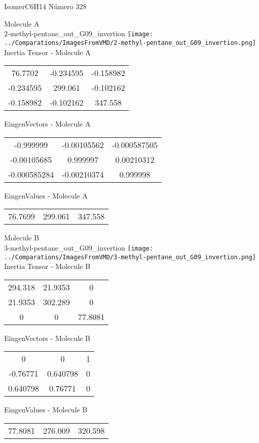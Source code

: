 \vtab[-2cm]
\begin{center}
{\large IsomerC6H14 \tab Número 328}
\end{center}
\begin{multicols}{2}
\begin{center}

Molecule A \\ 
2-methyl-pentane\_out\_G09\_invertion
\texttt{[image: ../Comparations/ImagesFromVMD/2-methyl-pentane\_out\_G09\_invertion.png]}
\\
Inertia Tensor - Molecule A \\
\vtab

\begin{tabular}{|c c c|}
76.7702	 & 	-0.234595	 & 	-0.158982	 \\
-0.234595	 & 	299.061	 & 	-0.102162	 \\
-0.158982	 & 	-0.102162	 & 	347.558
\end{tabular}

\vtab
 EingenVectors - Molecule A     \\
\vtab
\begin{tabular}{|c c c|}
-0.999999	 & 	-0.00105562	 & 	-0.000587505	 \\
-0.00105685	 & 	0.999997	 & 	0.00210312	 \\
-0.000585284	 & 	-0.00210374	 & 	0.999998
\end{tabular}

\vtab
 EingenValues - Molecule A     \\
\vtab
\begin{tabular}{|c c c|}
76.7699	 & 	299.061	 & 	347.558	 \\
\end{tabular}
\columnbreak

Molecule B \\ 
3-methyl-pentane\_out\_G09\_invertion
\texttt{[image: ../Comparations/ImagesFromVMD/3-methyl-pentane\_out\_G09\_invertion.png]}
\\
Inertia Tensor - Molecule B \\
\vtab

\begin{tabular}{|c c c|}
294.318	 & 	21.9353	 & 	0	 \\
21.9353	 & 	302.289	 & 	0	 \\
0	 & 	0	 & 	77.8081
\end{tabular}

\vtab
 EingenVectors - Molecule B     \\
\vtab
\begin{tabular}{|c c c|}
0	 & 	0	 & 	1	 \\
-0.76771	 & 	0.640798	 & 	0	 \\
0.640798	 & 	0.76771	 & 	0
\end{tabular}

\vtab
 EingenValues - Molecule B     \\
\vtab
\begin{tabular}{|c c c|}
77.8081	 & 	276.009	 & 	320.598	 \\
\end{tabular}

\end{center}
\end{multicols}
